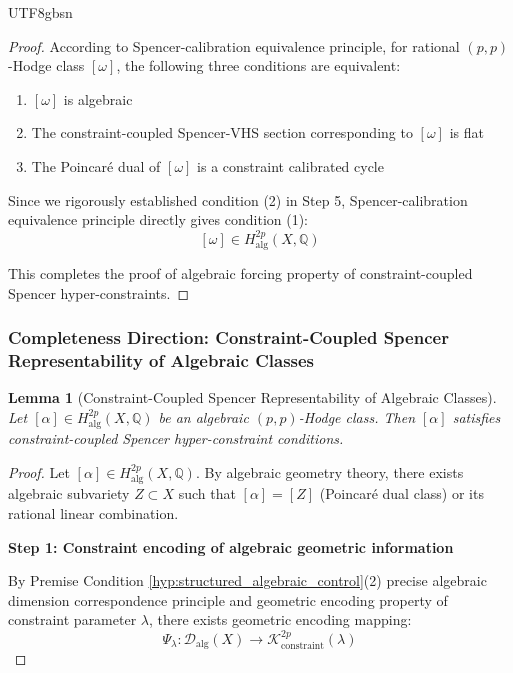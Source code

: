 \documentclass[a4paper,12pt]{extarticle}
\newtheorem{lemma}[theorem]{Lemma}
\theoremstyle{definition}
\begin{document}
\begin{CJK}{UTF8}{gbsn}
\begin{proof}
According to Spencer-calibration equivalence principle, for rational $(p,p)$-Hodge class $[\omega]$, the following three conditions are equivalent:
\begin{enumerate}
    \item $[\omega]$ is algebraic
    \item The constraint-coupled Spencer-VHS section corresponding to $[\omega]$ is flat
    \item The Poincaré dual of $[\omega]$ is a constraint calibrated cycle
\end{enumerate}

Since we rigorously established condition (2) in Step 5, Spencer-calibration equivalence principle directly gives condition (1):
\begin{equation}
\label{eq:algebraic_conclusion}
[\omega] \in H_{\text{alg}}^{2p}(X, \mathbb{Q})
\end{equation}

This completes the proof of algebraic forcing property of constraint-coupled Spencer hyper-constraints.
\end{proof}

\subsubsection{Completeness Direction: Constraint-Coupled Spencer Representability of Algebraic Classes}
\label{subsubsec:completeness_direction}

\begin{lemma}[Constraint-Coupled Spencer Representability of Algebraic Classes]
\label{lem:algebraic_constraint_spencer_representation}
Let $[\alpha] \in H_{\text{alg}}^{2p}(X, \mathbb{Q})$ be an algebraic $(p,p)$-Hodge class. Then $[\alpha]$ satisfies constraint-coupled Spencer hyper-constraint conditions.
\end{lemma}

\begin{proof}
Let $[\alpha] \in H_{\text{alg}}^{2p}(X, \mathbb{Q})$. By algebraic geometry theory, there exists algebraic subvariety $Z \subset X$ such that $[\alpha] = [Z]$ (Poincaré dual class) or its rational linear combination.

\textbf{Step 1: Constraint encoding of algebraic geometric information}

By Premise Condition \ref{hyp:structured_algebraic_control}(2) precise algebraic dimension correspondence principle and geometric encoding property of constraint parameter $\lambda$, there exists geometric encoding mapping:
\begin{equation}
\label{eq:encoding_map}
\Psi_\lambda: \mathcal{D}_{\text{alg}}(X) \to \mathcal{K}^{2p}_{\text{constraint}}(\lambda)
\end{equation}


\end{proof}
\end{CJK}
\end{document}

